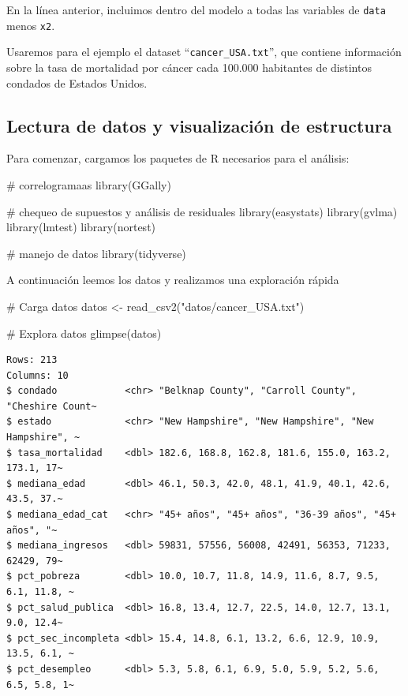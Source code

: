 \documentclass[
  spanish,
  a4paper,
]{scrbook}
\newenvironment{Shaded}{\begin{snugshade}}{\end{snugshade}}
\newcommand{\CommentTok}[1]{\textcolor[rgb]{0.37,0.37,0.37}{#1}}
\newcommand{\FunctionTok}[1]{\textcolor[rgb]{0.28,0.35,0.67}{#1}}
\newcommand{\NormalTok}[1]{\textcolor[rgb]{0.00,0.23,0.31}{#1}}
\newcommand{\OtherTok}[1]{\textcolor[rgb]{0.00,0.23,0.31}{#1}}
\newcommand{\StringTok}[1]{\textcolor[rgb]{0.13,0.47,0.30}{#1}}
\begin{document}
En la línea anterior, incluimos dentro del modelo a todas las variables
de \texttt{data} menos \texttt{x2}.

Usaremos para el ejemplo el dataset ``\texttt{cancer\_USA.txt}'', que
contiene información sobre la tasa de mortalidad por cáncer cada 100.000
habitantes de distintos condados de Estados Unidos.

\subsection{Lectura de datos y visualización de
estructura}\label{lectura-de-datos-y-visualizaciuxf3n-de-estructura}

Para comenzar, cargamos los paquetes de R necesarios para el análisis:

\begin{Shaded}
\begin{Highlighting}[]
\CommentTok{\# correlogramaas}
\FunctionTok{library}\NormalTok{(GGally)}

\CommentTok{\# chequeo de supuestos y análisis de residuales}
\FunctionTok{library}\NormalTok{(easystats)}
\FunctionTok{library}\NormalTok{(gvlma)}
\FunctionTok{library}\NormalTok{(lmtest)}
\FunctionTok{library}\NormalTok{(nortest)}

\CommentTok{\# manejo de datos}
\FunctionTok{library}\NormalTok{(tidyverse)}
\end{Highlighting}
\end{Shaded}

A continuación leemos los datos y realizamos una exploración rápida

\begin{Shaded}
\begin{Highlighting}[]
\CommentTok{\# Carga datos}
\NormalTok{datos }\OtherTok{\textless{}{-}} \FunctionTok{read\_csv2}\NormalTok{(}\StringTok{"datos/cancer\_USA.txt"}\NormalTok{)}

\CommentTok{\# Explora datos}
\FunctionTok{glimpse}\NormalTok{(datos)}
\end{Highlighting}
\end{Shaded}

\begin{verbatim}
Rows: 213
Columns: 10
$ condado            <chr> "Belknap County", "Carroll County", "Cheshire Count~
$ estado             <chr> "New Hampshire", "New Hampshire", "New Hampshire", ~
$ tasa_mortalidad    <dbl> 182.6, 168.8, 162.8, 181.6, 155.0, 163.2, 173.1, 17~
$ mediana_edad       <dbl> 46.1, 50.3, 42.0, 48.1, 41.9, 40.1, 42.6, 43.5, 37.~
$ mediana_edad_cat   <chr> "45+ años", "45+ años", "36-39 años", "45+ años", "~
$ mediana_ingresos   <dbl> 59831, 57556, 56008, 42491, 56353, 71233, 62429, 79~
$ pct_pobreza        <dbl> 10.0, 10.7, 11.8, 14.9, 11.6, 8.7, 9.5, 6.1, 11.8, ~
$ pct_salud_publica  <dbl> 16.8, 13.4, 12.7, 22.5, 14.0, 12.7, 13.1, 9.0, 12.4~
$ pct_sec_incompleta <dbl> 15.4, 14.8, 6.1, 13.2, 6.6, 12.9, 10.9, 13.5, 6.1, ~
$ pct_desempleo      <dbl> 5.3, 5.8, 6.1, 6.9, 5.0, 5.9, 5.2, 5.6, 6.5, 5.8, 1~
\end{verbatim}
\end{document}
